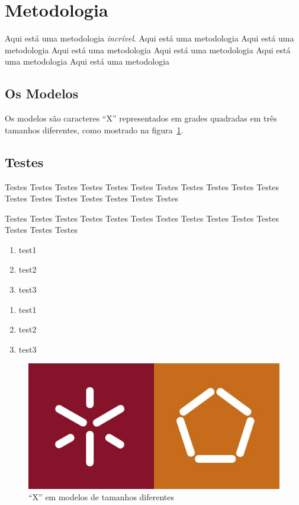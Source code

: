 \documentclass{llncs}
\begin{document}
%
\section{Metodologia}
%
Aqui está uma metodologia \emph{incrível}. Aqui está uma metodologia  
Aqui está uma metodologia Aqui está uma metodologia Aqui está uma metodologia Aqui está uma metodologia 
Aqui está uma metodologia 
%

\subsection{Os Modelos}
%
Os modelos são caracteres \enquote{X} representados em grades quadradas em três tamanhos diferentes, como mostrado na figura~\ref{fig:xs}.

\subsection{Testes}
Testes Testes Testes Testes Testes Testes Testes Testes Testes Testes Testes Testes Testes Testes Testes Testes Testes Testes \par Testes Testes Testes Testes Testes Testes Testes Testes Testes Testes Testes Testes Testes Testes
\begin{enumerate}
  \item test1
  \item test2
  \item test3
\end{enumerate}
\renewcommand{\labelenumiii}{\roman{enumiii}}
\begin{enumerate}[i]
  \item test1
  \item test2
  \item test3
\end{enumerate}

\begin{figure}[ht]
\includegraphics[scale=0.5]{uminho.jpg}
\centering
\caption{\enquote{X} em modelos de tamanhos diferentes}
\label{fig:xs}
\end{figure}
\end{document}
